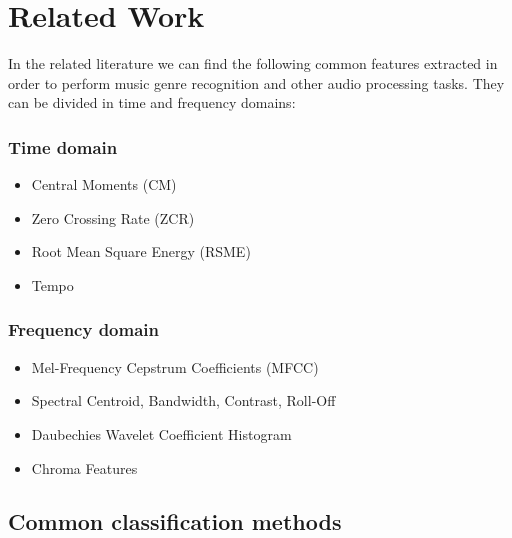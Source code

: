 \section{Related Work}

In the related literature we can find the following common features extracted in order to perform music genre recognition and other audio processing tasks. They can be divided in time and frequency domains:


\subsubsection{Time domain}

\begin{itemize}
    \item Central Moments (CM)
    \item Zero Crossing Rate (ZCR) \cite{Li2006}
    \item Root Mean Square Energy (RSME) \cite{Tao}
    \item Tempo
\end{itemize}

\subsubsection{Frequency domain}

\begin{itemize}
    \item Mel-Frequency Cepstrum Coefficients (MFCC) \cite{Li2006, Nanni2016, Hoffmann2016, Lim2012}
    \item Spectral Centroid, Bandwidth, Contrast, Roll-Off \cite{Li2006, Li2005}
    \item Daubechies Wavelet Coefficient Histogram \cite{Li2006}
    \item Chroma Features
\end{itemize}

\subsection{Common classification methods}

